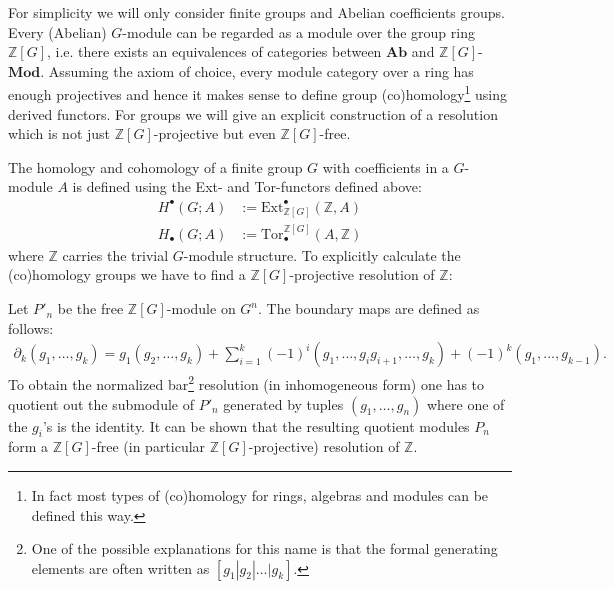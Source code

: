 	For simplicity we will only consider finite groups and Abelian coefficients groups. Every (Abelian) $G$-module can be regarded as a module over the group ring $\mathbb{Z}[G]$, i.e. there exists an equivalences of categories between $\mathbf{Ab}$ and $\mathbb{Z}[G]$-$\mathbf{Mod}$. Assuming the axiom of choice, every module category over a ring has enough projectives and hence it makes sense to define group (co)homology\footnote{In fact most types of (co)homology for rings, algebras and modules can be defined this way.} using derived functors. For groups we will give an explicit construction of a resolution which is not just $\mathbb{Z}[G]$-projective but even $\mathbb{Z}[G]$-free.

	The homology and cohomology of a finite group $G$ with coefficients in a $G$-module $A$ is defined using the Ext- and Tor-functors defined above:
	\begin{align}
		H^\bullet(G; A) &:= \text{Ext}_{\mathbb{Z}[G]}^\bullet(\mathbb{Z}, A)\\
		H_\bullet(G; A) &:= \text{Tor}^{\mathbb{Z}[G]}_\bullet(A, \mathbb{Z})
	\end{align}
	where $\mathbb{Z}$ carries the trivial $G$-module structure. To explicitly calculate the (co)homology groups we have to find a $\mathbb{Z}[G]$-projective resolution of $\mathbb{Z}$:
	\begin{construct}
		Let $P'_n$ be the free $\mathbb{Z}[G]$-module on $G^n$. The boundary maps are defined as follows:
		\begin{gather}
			\label{homalg:group_boundary}
			\partial_k(g_1, \ldots, g_k) = g_1(g_2, \ldots, g_k) + \sum_{i=1}^k (-1)^i(g_1, \ldots, g_ig_{i+1}, \ldots, g_k) + (-1)^k (g_1, \ldots, g_{k-1}).
		\end{gather}
		To obtain the normalized bar\footnote{One of the possible explanations for this name is that the formal generating elements are often written as $[g_1|g_2|\ldots|g_k]$.} resolution (in inhomogeneous form) one has to quotient out the submodule of $P'_n$ generated by tuples $(g_1,\ldots,g_n)$ where one of the $g_i$'s is the identity. It can be shown that the resulting quotient modules $P_n$ form a $\mathbb{Z}[G]$-free (in particular $\mathbb{Z}[G]$-projective) resolution of $\mathbb{Z}$.
	\end{construct}

